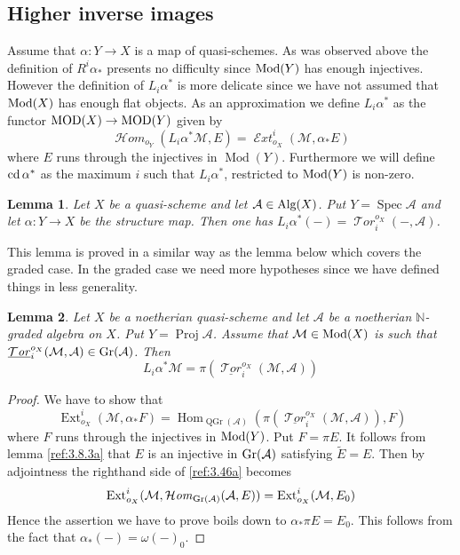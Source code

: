 \documentclass{amsproc}
\def \NN{{\mathbb N}}
\def\Ascr{{\mathcal A}}
\def\Escr{{\mathcal E}}
\def\Hscr{{\mathcal H}}
\def\Mscr{{\mathcal M}}
\def\Tscr{{\mathcal T}}
\def\HHom{\operatorname {\Hscr \mathit{om}}}
\def\HExt{\operatorname {\Escr \mathit{xt}}}
\def\HTor{\operatorname {\Tscr \mathit{or}}}
\def\cd{\mathop{\text{cd}}}
\def\Mod{\mathop{\text{Mod}}}
\def\MOD{\mathop{\text{MOD}}}
\def\Gr{\mathop{\text{Gr}}}
\def\Alg{\mathop{\text{Alg}}}
\def\Spec{\operatorname {Spec}}
\def\Ext{\operatorname {Ext}}
\def\Hom{\operatorname {Hom}}
\def\HHom{\operatorname {\Hscr \mathit{om}}}
\def\HExt{\operatorname {\Escr \mathit{xt}}}
\def\HTor{\operatorname {\Tscr \mathit{or}}}
\def\Proj{\operatorname {Proj}}
\def\Qch{\operatorname {Mod}}
\def\r{\rightarrow}
\let\oldtext\text
\def\text#1{\oldtext{\upshape #1}}
\DeclareMathOperator{\QGr}{QGr}
\newtheorem{lemmas}{Lemma}[subsection]
\theoremstyle{definition}
\theoremstyle{remark}
\numberwithin{equation}{section}
\numberwithin{table}{section}
\numberwithin{figure}{section}
\def\Gr{\mathop{\text{Gr}}}
\begin{document}
\subsection{Higher inverse images}
\label{ref:3.10b}
Assume that $\alpha:Y\r X$ is a map of quasi-schemes. As was observed
above the definition of $R^i\alpha_\ast$ presents no difficulty since
$\Mod(Y)$ has enough injectives. However the definition of
$L_i\alpha^\ast$ is more delicate since we have not assumed that
$\Mod(X)$ has enough flat objects. As an approximation we define
$L_i\alpha^\ast$ as the functor $\MOD(X)\r \MOD(Y)$  given by
\[
\HHom_{o_Y}(L_i\alpha^\ast \Mscr,E)=\HExt^i_{o_X}(\Mscr,\alpha_\ast E)
\]
where $E$ runs through the injectives in $\Qch(Y)$. 
Furthermore we will define $\cd \alpha^\ast$ as the maximum $i$ such
that $L_i\alpha^\ast$, restricted to $\Mod(Y)$ is non-zero.
\begin{lemmas}
Let $X$ be a quasi-scheme and let $\Ascr\in\Alg(X)$. Put
$Y=\Spec \Ascr$ and let $\alpha:Y\r X$ be the structure
map. Then one has $L_i\alpha^\ast(-)=\HTor_i^{o_X}(-,\Ascr)$.
\end{lemmas}
This lemma is proved in a similar way as the lemma below which covers
the graded case. In the graded case we need more hypotheses since we
have defined things in less generality.
\begin{lemmas}
\label{ref:3.10.2a}
Let $X$ be a noetherian quasi-scheme and let $\Ascr$ be a noetherian
$\NN$-graded algebra on $X$. Put $Y=\Proj\Ascr$. Assume that
$\Mscr\in\Mod(X)$ is such that
$\underline{\HTor}_i^{o_X}(\Mscr,\Ascr)\in \Gr(\Ascr)$. Then
\[
L_i\alpha^\ast\Mscr=\pi(\underline{\HTor}_i^{o_X}(\Mscr,\Ascr))
\]
\end{lemmas}
\begin{proof}
We have to show that 
\begin{equation}\
\label{ref:3.46a}
\Ext^i_{o_X}(\Mscr,\alpha_\ast F)= \Hom_{\QGr(\Ascr)}
( \pi(\underline{\HTor}_i^{o_X}(\Mscr,\Ascr)) ,F)
\end{equation}
where $F$ runs through the injectives in $\Mod(Y)$. Put $F=\pi E$. It
follows from lemma
\ref{ref:3.8.3a}  that   $E$ is
an injective in $\Gr(\Ascr)$ satisfying $\tilde{E}=E$. Then by
adjointness the righthand side of \eqref{ref:3.46a} becomes 
\[
\Ext^i_{o_X}(\Mscr,\HHom_{\Gr(\Ascr)}(\Ascr,E))
=
\Ext^i_{o_X}(\Mscr,E_0)
\]
Hence the assertion we have to prove  boils down to $\alpha_\ast \pi
E=E_0$. This follows from the fact that $\alpha_\ast(-)=\omega(-)_0$.
\end{proof}
\end{document}
